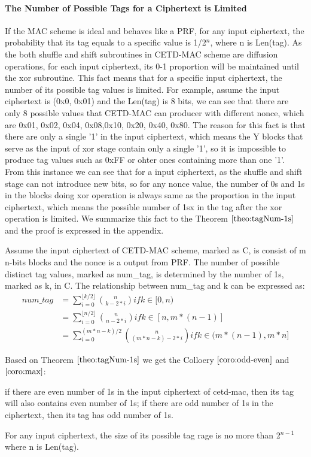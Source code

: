 \paragraph{The Number of Possible Tags for a Ciphertext is Limited}
\label{sect:bit-proportion}
If the MAC scheme is ideal and behaves like a PRF, for any input ciphertext, the probability that its tag equals to a specific value is 1/2$^n$, where n is Len(tag). 
As the both shuffle and shift subroutines in CETD-MAC scheme are diffusion operations, for each input ciphertext, its 0-1 proportion will be maintained until the xor subroutine. This fact means that for a specific input ciphertext, the number of its possible tag values is limited. For example, assume the input ciphertext is (0x0, 0x01) and the Len(tag) is 8 bits, we can see that there are only 8 possible values that CETD-MAC can producer with different nonce, which are {0x01, 0x02, 0x04, 0x08,0x10, 0x20, 0x40, 0x80}. The reason for this fact is that there are only a single '1' in the input ciphertext, which means the Y blocks that serve as the input of xor stage contain only a single '1', so it is impossible to produce tag values such as 0xFF or ohter ones containing more than one '1'. From this instance we can see that for a input ciphertext, as the shuffle and shift stage can not introduce new bits, so for any nonce value, the number of 0s and 1s in the blocks doing xor operation is always same as the proportion in the input ciphertext, which means the possible number of 1sx in the tag after the xor operation is limited. We summarize this fact to the Theorem $\ref{theo:tagNum-1s}$ and the proof is expressed in the appendix.
\begin{theorem}\label{theo:tagNum-1s}
Assume the input ciphertext of CETD-MAC scheme, marked as C,  is consist of m n-bits blocks and the nonce is a output from PRF. The number of possible distinct tag values, marked as num\_tag, is determined by the number of 1s, marked as k, in C. The relationship between num\_tag and k can be expressed as:
\begin{equation}\label{equ:tagNum-1s}
\begin{split}
num\_tag &= \sum_{i=0}^{\lfloor k/2 \rfloor} \binom{n}{k-2*i} if k \in [0,n)\\ 
		& =\sum_{i=0}^{\lfloor n/2 \rfloor} \binom{n}{n-2*i} if k \in [n,m*(n-1)]\\
		& = \sum_{i=0}^{(m*n-k)/2} \binom{n}{(m*n - k)-2*i} if k \in (m*(n-1),m*n] 	 
\end{split}
\end{equation}
\end{theorem}
Based on Theorem $\ref{theo:tagNum-1s}$ we get the Colloery $\ref{coro:odd-even}$ and $\ref{coro:max}$:
\begin{corollary} \label{coro:odd-even}
if there are even number of 1s in the input ciphertext of cetd-mac, then its tag will also contains even number of 1s; if there are odd number of 1s in the ciphertext, then its tag has odd number of 1s.
\end{corollary}
\begin{corollary} \label{coro:max}
For any input ciphertext, the size of its possible tag rage is no more than 2$^{n-1}$ where n is Len(tag).
\end{corollary}

